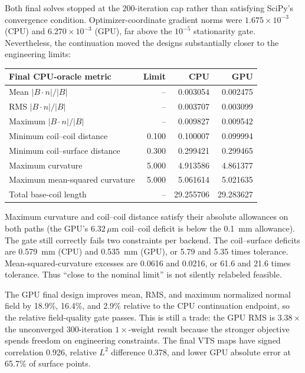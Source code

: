 \documentclass[11pt,a4paper]{article}
\begin{document}
Both final solves stopped at the 200-iteration cap rather than satisfying
SciPy's convergence condition.  Optimizer-coordinate gradient norms were
$1.675\times10^{-3}$ (CPU) and $6.270\times10^{-3}$ (GPU), far above the
$10^{-5}$ stationarity gate.  Nevertheless, the continuation moved the designs
substantially closer to the engineering limits:

\begin{center}
\begin{tabular}{lrrr}
\toprule
Final CPU-oracle metric & Limit & CPU & GPU \\
\midrule
Mean $|B\cdot n|/|B|$ & -- & 0.003054 & 0.002475 \\
RMS $|B\cdot n|/|B|$ & -- & 0.003707 & 0.003099 \\
Maximum $|B\cdot n|/|B|$ & -- & 0.009827 & 0.009542 \\
Minimum coil--coil distance & 0.100 & 0.100007 & 0.099994 \\
Minimum coil--surface distance & 0.300 & 0.299421 & 0.299465 \\
Maximum curvature & 5.000 & 4.913586 & 4.861377 \\
Maximum mean-squared curvature & 5.000 & 5.061614 & 5.021635 \\
Total base-coil length & -- & 29.255706 & 29.283627 \\
\bottomrule
\end{tabular}
\end{center}

Maximum curvature and coil--coil distance satisfy their absolute allowances on
both paths (the GPU's $6.32\,\mu$m coil--coil deficit is below the 0.1~mm
allowance).  The gate still correctly fails two constraints per backend.  The
coil--surface deficits are 0.579~mm (CPU) and 0.535~mm (GPU), or 5.79 and 5.35
times tolerance.  Mean-squared-curvature excesses are 0.0616 and 0.0216, or
61.6 and 21.6 times tolerance.  Thus ``close to the nominal limit'' is not
silently relabeled feasible.

The GPU final design improves mean, RMS, and maximum normalized normal field by
18.9\%, 16.4\%, and 2.9\% relative to the CPU continuation endpoint, so the
relative field-quality gate passes.  This is still a trade: the GPU RMS is
$3.38\times$ the unconverged 300-iteration $1\times$-weight result because the
stronger objective spends freedom on engineering constraints.  The final VTS
maps have signed correlation 0.926, relative $L^2$ difference 0.378, and lower
GPU absolute error at 65.7\% of surface points.
\end{document}
